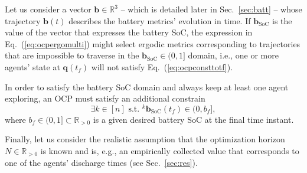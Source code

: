 \documentclass[letterpaper,10pt,conference,twoside]{IEEEtran}
\theoremstyle{definition}
\begin{document}
Let us consider a vector $\mathbf{b}\in\mathbb{R}^3$ -- which is detailed later in Sec.~\ref{sec:batt} -- whose trajectory $\mathbf{b}(t)$ describes the battery metrics' evolution in time. If $\mathbf{b}_{\text{SoC}}$ is the value of the vector that expresses the battery %
SoC, the expression in Eq.~(\ref{eq:ocpergomulti}) might select ergodic metrics corresponding to trajectories that are impossible to traverse in the $\mathbf{b}_{\text{SoC}}\in(0,1]$ domain, i.e., one or more agents' state at $\mathbf{q}(t_f)$ will not satisfy Eq.~(\ref{eq:ocpconsttotf}).

In order to satisfy the battery SoC domain and always keep at least one agent exploring, an OCP must satisfy an additional constrain
\begin{equation}\label{eq:ocpbattconst}
  \exists k\in[n]\text{ s.t. }{}^k\mathbf{b}_{\text{SoC}}(t_f)\in(0,b_f],
\end{equation}
where $b_f\in(0,1]\subset\mathbb{R}_{>0}$ is a given desired battery SoC at the final time instant.

Finally, let us consider the realistic assumption that the optimization horizon $N\in\mathbb{R}_{>0}$ is known and is,
e.g., an empirically collected value that corresponds to one of the agents' discharge times (see Sec.~\ref{sec:res}).
\end{document}
